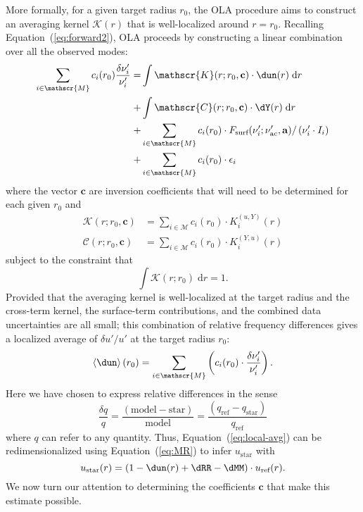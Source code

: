 More formally, for a given target radius $r_0$, the OLA procedure aims to construct an averaging kernel $\mathscr{K}(r)$ that is well-localized around ${r=r_0}$. 
Recalling Equation~(\ref{eq:forward2}), OLA proceeds by constructing a linear combination over all the observed modes: 
\begin{align} \label{eq:OLA}
    \sum_{i \in \mathscr{M}} c_i(r_0) \frac{\delta\nu_i'}{\nu_i'}
    =
    &\int \mathscr{K}(r; r_0, \mathbf c) \cdot \dun(r) \; \text{d}r \notag
\\ +&\int \mathscr{C}(r; r_0, \mathbf c) \cdot \dY(r) \; \text{d}r \notag
\\ +&\sum_{i \in \mathscr{M}} c_i(r_0) \cdot F_{\text{surf}}(\nu_i'; \nu'_{\text{ac}}, \mathbf a)/\left(\nu_i' \cdot I_i \right) \notag
\\ +&\sum_{i \in \mathscr{M}} c_i(r_0) \cdot \epsilon_i
\end{align}
where the vector $\mathbf c$ are inversion coefficients that will need to be determined for each given $r_0$ and
\begin{align}
    \mathscr{K}(r; r_0, \mathbf c) &= \sum_{i \in \mathscr{M}} c_i(r_0) \cdot K_i^{(u, Y)}(r)
\\  \mathscr{C}(r; r_0, \mathbf c) &= \sum_{i \in \mathscr{M}} c_i(r_0) \cdot K_i^{(Y, u)}(r)
\end{align}
subject to the constraint that 
\begin{equation} \label{eq:sum-to-one}
    \int \mathscr{K}(r; r_0) \; \text{d}r = 1.
\end{equation}
Provided that the averaging kernel is well-localized at the target radius and the cross-term kernel, the surface-term contributions, and the combined data uncertainties are all small; this combination of relative frequency differences gives a localized average of ${\delta u'/u'}$ at the target radius $r_0$:
\begin{equation} \label{eq:local-avg}
    \left\langle \dun \right\rangle (r_0) = \sum_{i \in \mathscr{M}} \left( c_i(r_0) \cdot \frac{\delta\nu_i'}{\nu_i'} \right). 
\end{equation}
Here we have chosen to express relative differences in the sense
\begin{equation} \label{eq:rel-diff}
    \frac{\delta q}{q} = \frac{(\text{model} - \text{star})}{\text{model}} = \frac{ (q_{\text{ref}} - q_{\text{star}}) }{q_{\text{ref}}}
\end{equation} 
where $q$ can refer to any quantity. 
Thus, Equation~(\ref{eq:local-avg}) can be redimensionalized using Equation~(\ref{eq:MR}) to infer $u_{\text{star}}$ with
\begin{equation} \label{eq:dimensional}
     u_{\text{star}}(r) = \left( 1 - \dun(r) + \dRR - \dMM \right) \cdot u_{\text{ref}}(r).
\end{equation}
We now turn our attention to determining the coefficients $\mathbf c$ that make this estimate possible. 


